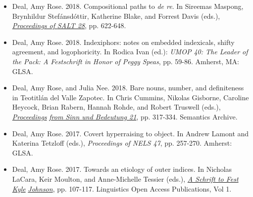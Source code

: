 \documentclass[12pt]{article}
\begin{document}
\begin{itemize}[labelsep=.5cm,leftmargin=0cm,itemindent=0cm]
\item \new Deal, Amy Rose. 2018. Compositional paths to \emph{de re}. In Sireemas Maspong, Brynhildur Stef\'ansd\'ottir, Katherine Blake, and Forrest Davis (eds.),  \href{https://journals.linguisticsociety.org/proceedings/index.php/SALT/issue/view/162}{\emph{Proceedings of }} \href{https://journals.linguisticsociety.org/proceedings/index.php/SALT/issue/view/162}{\emph{SALT 28}}, pp. 622-648. 

\item \new Deal, Amy Rose. 2018. Indexiphors: notes on embedded indexicals, shifty agreement, and logophoricity. In Rodica Ivan (ed.): \emph{UMOP 40: The Leader of the Pack: A Festschrift in Honor of Peggy Speas}, pp. 59-86. Amherst, MA: GLSA. 




\item \new Deal, Amy Rose, and Julia Nee. 2018. Bare nouns, number, and definiteness in Teotitl\'an del Valle Zapotec. In Chris Cummins, Nikolas Gisborne, Caroline Heycock, Brian Rabern, Hannah Rohde, and Robert Truswell (eds.), \href{https://semanticsarchive.net/Archive/DRjNjViN/index.html}{\emph{Proceedings}} \href{https://semanticsarchive.net/Archive/DRjNjViN/index.html}{\emph{from Sinn und Bedeutung 21}}, pp. 317-334. Semantics Archive. 


  
\item \new Deal, Amy Rose. 2017. Covert hyperraising to object. In Andrew Lamont and Katerina Tetzloff (eds.), \emph{Proceedings of NELS 47}, pp. 257-270. Amherst: GLSA. 
  
  
\item \new Deal, Amy Rose. 2017. Towards an etiology of outer indices. In Nicholas LaCara, Keir Moulton, and Anne-Michelle Tessier (eds.), \href{https://scholarworks.umass.edu/linguist_oapubs/1/}{\emph{A Schrift to Fest Kyle}} \href{https://scholarworks.umass.edu/linguist_oapubs/1/}{\emph{Johnson}}, pp. 107-117. Linguistics Open Access Publications, Vol 1. %
  

\end{itemize}
\end{document}
